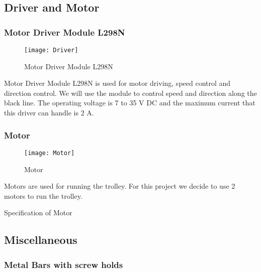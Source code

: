 \documentclass[12pt]{article}
\begin{document}
\newpage 

\subsection{Driver and Motor} \label{sub:drivernmotor}

\subsubsection{Motor Driver Module L298N} \label{subsub:driver}

\begin{figure}[H]
	\centering
	\texttt{[image: Driver]}
	\caption{Motor Driver Module L298N} \label{fig:driver}
\end{figure}

Motor Driver Module L298N is used for motor driving, speed control and direction control. We will use the module to control speed and direction along the black line. The operating voltage is 7 to 35 V DC and the maximum current that this driver can handle is 2 A.

\subsubsection{Motor} \label{subsub:motor}

\begin{figure}[H]
	\centering
	\texttt{[image: Motor]}
	\caption{Motor} \label{fig:motor}
\end{figure}

Motors are used for running the trolley. For this project we decide to use 2 motors to run the trolley.

\begin{table}[H]
	\centering
	\label{tab:motor}
	\caption{Specification of Motor}
\end{table}

\subsection{Miscellaneous} \label{sub:misc}

\subsubsection{Metal Bars with screw holds} \label{subsub:metal}
\end{document}
